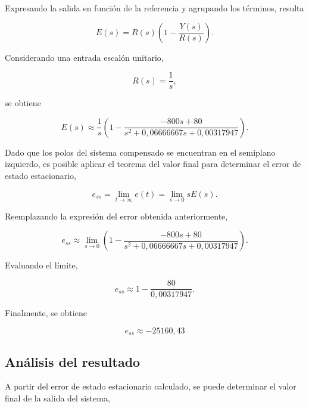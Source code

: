 \documentclass[10pt]{article}
\begin{document}
Expresando la salida en función de la referencia
y agrupando los términos, resulta

\begin{equation}
    E(s)=R(s)
    \left(
        1-\frac{Y(s)}{R(s)}
    \right).
\end{equation}

Considerando una entrada escalón unitario,

\begin{equation}
    R(s)=\frac{1}{s},
\end{equation}

se obtiene

\begin{equation}
    E(s)\approx\frac{1}{s}
    \left(
        1-
        \frac{-800s+80}
        {s^2+0{,}06666667s+0{,}00317947}
    \right).
\end{equation}

Dado que los polos del sistema compensado se encuentran
en el semiplano izquierdo, es posible aplicar el
teorema del valor final para determinar el error
de estado estacionario,

\begin{equation}
    e_{ss}=\lim_{t\to\infty}e(t)
    =\lim_{s\to0}sE(s).
\end{equation}

Reemplazando la expresión del error obtenida anteriormente,

\begin{equation}
    e_{ss}\approx\lim_{s\to0}
    \left(
        1-
        \frac{-800s+80}
        {s^2+0{,}06666667s+0{,}00317947}
    \right).
\end{equation}

Evaluando el límite,

\begin{equation}
    e_{ss}\approx
    1-\frac{80}{0{,}00317947}.
\end{equation}

Finalmente, se obtiene

\begin{equation}
    \boxed{
        e_{ss}\approx-25160{,}43
    }
    \label{eq:ej9_error}
\end{equation}


\subsection{Análisis del resultado}

A partir del error de estado estacionario calculado,
se puede determinar el valor final de la salida
del sistema,
\end{document}
